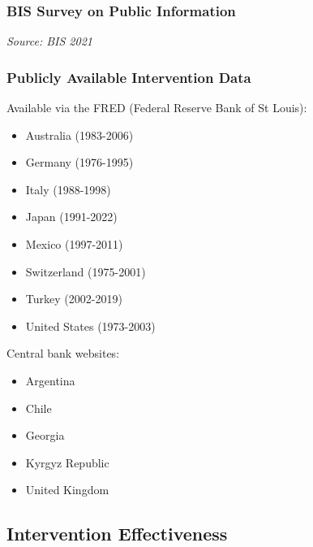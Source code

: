 \documentclass{beamer}
\begin{document}
\begin{frame}
  \frametitle{BIS Survey on Public Information}
  \medskip
  \emph{Source: BIS 2021 \href{https://www.bis.org/publ/mc_insights_fxinterventions.pdf}{}}
\end{frame}


\begin{frame}
  \frametitle{Publicly Available Intervention Data}
  Available via the FRED (Federal Reserve Bank of St Louis):

  \begin{itemize}
  \item Australia (1983-2006)
  \item Germany (1976-1995)
  \item Italy (1988-1998)
  \item Japan (1991-2022)
  \item Mexico (1997-2011)
  \item Switzerland (1975-2001)
  \item Turkey (2002-2019)
  \item United States (1973-2003)
  \end{itemize}

  Central bank websites:
  \begin{itemize}
  \item Argentina
  \item Chile
  \item Georgia
  \item Kyrgyz Republic
  \item United Kingdom
  \end{itemize}  
\end{frame}

\subsection{Intervention Effectiveness}
\end{document}
